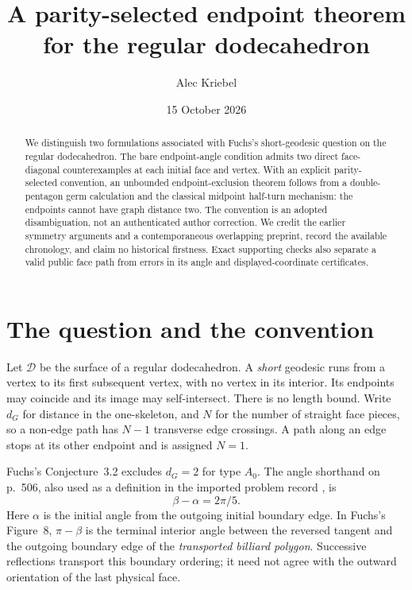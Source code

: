 \documentclass[11pt]{amsart}
\title[A dodecahedral endpoint theorem]{A parity-selected endpoint theorem for the regular dodecahedron}
\author{Alec Kriebel}
\date{15 October 2026}
\theoremstyle{remark}
\newcommand{\D}{\mathcal D}
\begin{document}
\begin{abstract}
We distinguish two formulations associated with Fuchs's short-geodesic question on the regular dodecahedron. The bare endpoint-angle condition admits two direct face-diagonal counterexamples at each initial face and vertex. With an explicit parity-selected convention, an unbounded endpoint-exclusion theorem follows from a double-pentagon germ calculation and the classical midpoint half-turn mechanism: the endpoints cannot have graph distance two. The convention is an adopted disambiguation, not an authenticated author correction. We credit the earlier symmetry arguments and a contemporaneous overlapping preprint, record the available chronology, and claim no historical firstness. Exact supporting checks also separate a valid public face path from errors in its angle and displayed-coordinate certificates.
\end{abstract}
\maketitle

\section{The question and the convention}
Let $\D$ be the surface of a regular dodecahedron. A \emph{short} geodesic runs from a vertex to its first subsequent vertex, with no vertex in its interior. Its endpoints may coincide and its image may self-intersect. There is no length bound. Write $d_G$ for distance in the one-skeleton, and $N$ for the number of straight face pieces, so a non-edge path has $N-1$ transverse edge crossings. A path along an edge stops at its other endpoint and is assigned $N=1$.

Fuchs's Conjecture~3.2 \cite[p.~515]{Fuchs} excludes $d_G=2$ for type $A_0$. The angle shorthand on p.~506, also used as a definition in the imported problem record \cite{Dataset}, is
\begin{equation}\label{bare}
                    \beta-\alpha=2\pi/5.
\end{equation}
Here $\alpha$ is the initial angle from the outgoing initial boundary edge. In Fuchs's Figure~8, $\pi-\beta$ is the terminal interior angle between the reversed tangent and the outgoing boundary edge of the \emph{transported billiard polygon}. Successive reflections transport this boundary ordering; it need not agree with the outward orientation of the last physical face.
\end{document}
